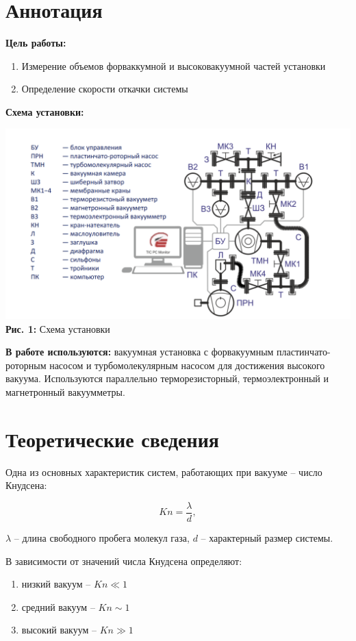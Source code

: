 \documentclass[12pt,a4paper]{scrartcl}
\begin{document}
	\section{Аннотация}
	
	\textbf{Цель работы: }
	\begin{enumerate}
		\item Измерение объемов форваккумной и высоковакуумной частей установки
		\item Определение скорости откачки системы
	\end{enumerate}
	
	\textbf{Схема установки:}
	\begin{center}
		\includegraphics[scale=0.3]{PIC_1.png}
		\\\textbf{Рис. 1:} Схема установки
	\end{center}
	
	\textbf{В работе используются:}
	вакуумная установка с форвакуумным пластинчато-роторным насосом и турбомолекулярным насосом для достижения высокого вакуума. Используются параллельно терморезисторный, термоэлектронный и магнетронный вакуумметры.
	
	\section{Теоретические сведения}
	
	Одна из основных характеристик систем, работающих при вакууме -- число Кнудсена:
	
	\begin{equation}
	Kn = \frac{\lambda}{d}, 
	\end{equation}
	
	$\lambda$ -- длина свободного пробега молекул газа, $d$ -- характерный размер системы.
	
	\medskip
	В зависимости от значений числа Кнудсена определяют:
	\begin{enumerate}
		\item низкий вакуум -- $Kn \ll 1$
		\item средний вакуум -- $Kn \sim 1$
		\item высокий вакуум -- $Kn \gg 1$
	\end{enumerate}
	
\end{document}
